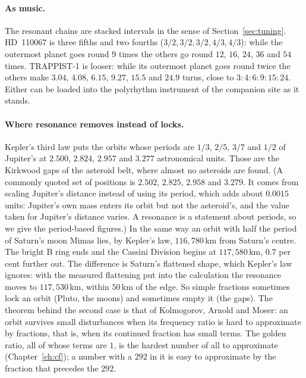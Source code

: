 \paragraph{As music.} The resonant chains are stacked intervals in the sense of Section~\ref{sec:tuning}. HD~110067 is
three fifths and two fourths ($3/2,3/2,3/2,4/3,4/3$): while the outermost planet goes round $9$ times the
others go round $12$, $16$, $24$, $36$ and $54$ times. TRAPPIST-1 is looser: while its outermost planet
goes round twice the others make $3.04$, $4.08$, $6.15$, $9.27$, $15.5$ and $24.9$ turns, close to
$3:4:6:9:15:24$. Either can be loaded into the polyrhythm instrument of the companion site as it stands.

\paragraph{Where resonance removes instead of locks.} Kepler's third law puts the orbits whose periods
are $1/3$, $2/5$, $3/7$ and $1/2$ of Jupiter's at $2.500$, $2.824$, $2.957$ and $3.277$ astronomical
units. Those are the Kirkwood gaps of the asteroid belt, where almost no asteroids are found. (A commonly
quoted set of positions is $2.502$, $2.825$, $2.958$ and $3.279$. It comes from scaling Jupiter's distance
instead of using its period, which adds about $0.0015$ units: Jupiter's own mass enters its orbit but not
the asteroid's, and the value taken for Jupiter's distance varies. A resonance is a statement about
periods, so we give the period-based figures.) In the same way an orbit with half the period of Saturn's
moon Mimas lies, by Kepler's law, $116{,}780$\,km from Saturn's centre. The bright B ring ends and the
Cassini Division begins at $117{,}580$\,km, $0.7$ per cent further out. The difference is Saturn's
flattened shape, which Kepler's law ignores: with the measured flattening put into the calculation the
resonance moves to $117{,}530$\,km, within $50$\,km of the edge. So simple fractions sometimes lock an orbit
(Pluto, the moons) and sometimes empty it (the gaps). The theorem behind the second case is that of
Kolmogorov, Arnold and Moser: an orbit survives small disturbances when its frequency ratio is hard to
approximate by fractions, that is, when its continued fraction has small terms. The golden ratio, all of
whose terms are $1$, is the hardest number of all to approximate (Chapter~\ref{ch:cf}); a number with a $292$ in it
is easy to approximate by the fraction that precedes the $292$.

